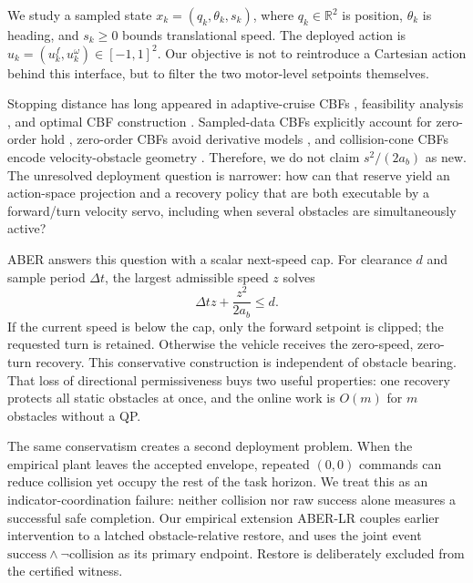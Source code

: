 \documentclass[letterpaper]{article}
\begin{document}
We study a sampled state $x_k=(q_k,\theta_k,s_k)$, where $q_k\in\mathbb R^2$
is position, $\theta_k$ is heading, and $s_k\ge0$ bounds translational speed.
The deployed action is $u_k=(u_k^f,u_k^\omega)\in[-1,1]^2$.  Our objective is
not to reintroduce a Cartesian action behind this interface, but to filter the
two motor-level setpoints themselves.

Stopping distance has long appeared in adaptive-cruise CBFs
\cite{ames2014,ames2017}, feasibility analysis
\cite{xiao2022feasibility}, and optimal CBF construction
\cite{beaver2024}.  Sampled-data CBFs explicitly account for zero-order hold
\cite{breeden2022,taylor2022}, zero-order CBFs avoid derivative models
\cite{tan2025}, and collision-cone CBFs encode velocity-obstacle geometry
\cite{tayal2024}.  Therefore, we do not claim
$s^2/(2a_b)$ as new.  The unresolved deployment question is narrower: how can
that reserve yield an action-space projection and a recovery policy that are
both executable by a forward/turn velocity servo, including when several
obstacles are simultaneously active?

ABER answers this question with a scalar next-speed cap.  For clearance
$d$ and sample period $\Delta t$, the largest admissible speed $z$ solves
\begin{equation}
 \Delta t z + \frac{z^2}{2a_b}\le d.                 \label{eq:capineq}
\end{equation}
If the current speed is below the cap, only the forward setpoint is clipped;
the requested turn is retained.  Otherwise the vehicle receives the
zero-speed, zero-turn recovery.  This conservative construction is independent
of obstacle bearing.  That loss of directional permissiveness buys two useful
properties: one recovery protects all static obstacles at once, and the online
work is $O(m)$ for $m$ obstacles without a QP.

The same conservatism creates a second deployment problem.  When the empirical
plant leaves the accepted envelope, repeated $(0,0)$ commands can reduce
collision yet occupy the rest of the task horizon.  We treat this as an
indicator-coordination failure: neither collision nor raw success alone
measures a successful safe completion.  Our empirical extension ABER-LR
couples earlier intervention to a latched obstacle-relative restore, and uses
the joint event $\mathrm{success}\land\neg\mathrm{collision}$ as its primary
endpoint.  Restore is deliberately excluded from the certified witness.
\end{document}

